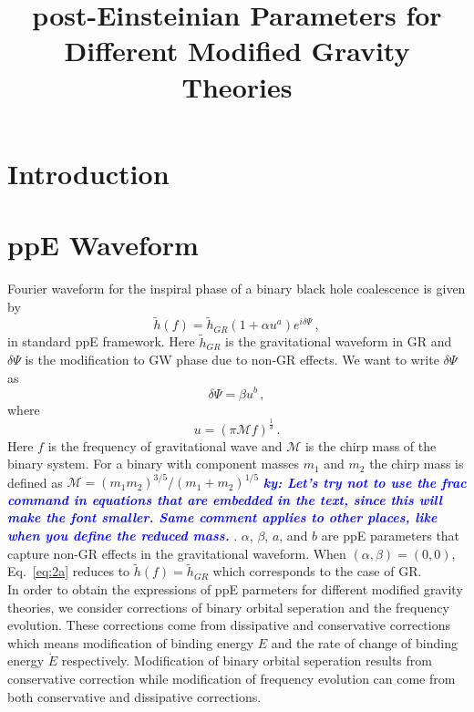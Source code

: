 \documentclass[11pt]{article}
\newcommand{\ky}[1]{\textcolor{blue}{\it{\textbf{ky: #1}}} }
\begin{document}
\title{post-Einsteinian Parameters for Different Modified Gravity Theories}
\maketitle
\section{Introduction}

\section{ppE Waveform}\label{section:ppE}
\hspace*{15.5pt}Fourier waveform for the inspiral phase of a binary black hole coalescence is given by ~\cite{Yunes:2009ke}
\begin{equation}\label{eq:2a}
\tilde{h}(f)=\tilde{h}_{GR}(1+\alpha u^a)e^{i\delta\Psi}\,,
\end{equation}
% 
in standard ppE framework. Here $\tilde{h}_{GR}$ is the gravitational waveform in GR and $\delta \Psi$ is the modification to GW phase due to non-GR effects. We want to write $\delta\Psi$ as 
\begin{equation}\label{eq:2b}
\delta\Psi=\beta u^b\,,
\end{equation}
where
\begin{equation}
u=(\pi \mathcal{M} f)^\frac{1}{3}\,.
\end{equation}
Here $f$ is the frequency of gravitational wave and $\mathcal{M}$ is the chirp mass of the binary system. For a binary with component masses $m_1$ and $m_2$ the chirp mass is defined as $\mathcal{M}=(m_1m_2)^{3/5}/(m_1+m_2)^{1/5}$ \ky{Let's try not to use the frac command in equations that are embedded in the text, since this will make the font smaller. Same comment applies to other places, like when you define the reduced mass.}. $\alpha$, $\beta$, $a$, and $b$ are ppE parameters that capture non-GR effects in the gravitational waveform. When $(\alpha,\beta) = (0,0)$, Eq.~\eqref{eq:2a} reduces to $\tilde{h}(f)=\tilde{h}_{GR}$ which corresponds to the case of GR.\\

\hspace{15.5pt} In order to obtain the expressions of ppE parmeters for different modified gravity theories, we consider corrections of binary orbital seperation and the frequency evolution. These corrections come from dissipative and conservative corrections which means modification of binding energy $E$ and the rate of change of binding energy $\dot{E}$ respectively. Modification of binary orbital seperation results from conservative correction while modification of frequency evolution can come from both conservative and dissipative corrections.\\
\end{document}
